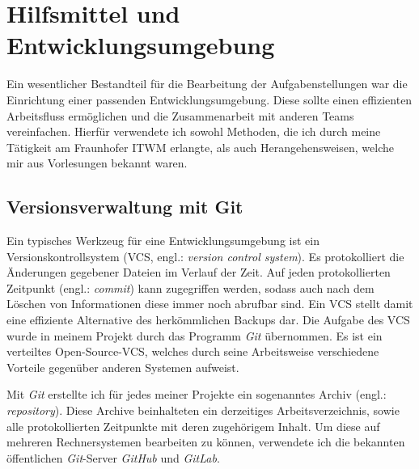 \documentclass[crop=false]{standalone}
\begin{document}
  \section{Hilfsmittel und Entwicklungsumgebung} %
  \label{sec:tools}

  Ein wesentlicher Bestandteil für die Bearbeitung der Aufgabenstellungen war die Einrichtung einer passenden Entwicklungsumgebung.
  Diese sollte einen effizienten Arbeitsfluss ermöglichen und die Zusammenarbeit mit anderen Teams vereinfachen.
  Hierfür verwendete ich sowohl Methoden, die ich durch meine Tätigkeit am Fraunhofer ITWM erlangte, als auch Herangehensweisen, welche mir aus Vorlesungen bekannt waren.

  \subsection{Versionsverwaltung mit Git} %
  \label{sub:git}
    Ein typisches Werkzeug für eine Entwicklungsumgebung ist ein Versionskontrollsystem (VCS, engl.: \textit{version control system}).
    Es protokolliert die Änderungen gegebener Dateien im Verlauf der Zeit.
    Auf jeden protokollierten Zeitpunkt (engl.: \textit{commit}) kann zugegriffen werden, sodass auch nach dem Löschen von Informationen diese immer noch abrufbar sind.
    Ein VCS stellt damit eine effiziente Alternative des herkömmlichen Backups dar.
    Die Aufgabe des VCS wurde in meinem Projekt durch das Programm \textit{Git} übernommen.
    Es ist ein verteiltes Open-Source-VCS, welches durch seine Arbeitsweise verschiedene Vorteile gegenüber anderen Systemen aufweist.

    Mit \textit{Git} erstellte ich für jedes meiner Projekte ein sogenanntes Archiv (engl.: \textit{repository}).
    Diese Archive beinhalteten ein derzeitiges Arbeitsverzeichnis, sowie alle protokollierten Zeitpunkte mit deren zugehörigem Inhalt.
    Um diese auf mehreren Rechnersystemen bearbeiten zu können, verwendete ich die bekannten öffentlichen \textit{Git}-Server \textit{GitHub} und \textit{GitLab}.
\end{document}

